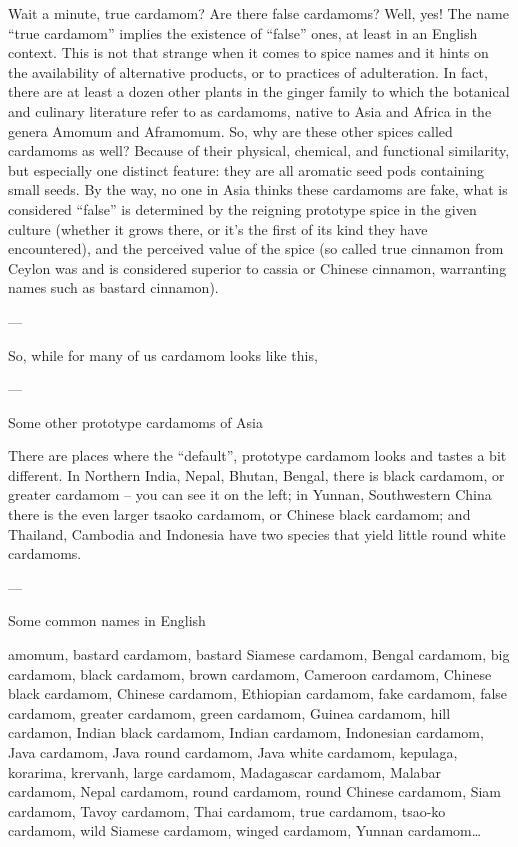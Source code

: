\documentclass[12pt]{article}
\begin{document}
Wait a minute, true cardamom? Are there false cardamoms? Well, yes! The name “true cardamom” implies the existence of “false” ones, at least in an English context.
This is not that strange when it comes to spice names and it hints on the availability of alternative products, or to practices of adulteration. 
In fact, there are at least a dozen other plants in the ginger family to which the botanical and culinary literature refer to as cardamoms, 
native to Asia and Africa in the genera Amomum and Aframomum.
So, why are these other spices called cardamoms as well? Because of their physical, chemical, and functional similarity, but especially one distinct feature: they are all aromatic seed pods containing small seeds. 
By the way, no one in Asia thinks these cardamoms are fake, what is considered “false” is determined by the reigning prototype spice in the given culture (whether it grows there, or it’s the first of its kind they have encountered), and the perceived value of the spice (so called true cinnamon from Ceylon was and is considered superior to cassia or Chinese cinnamon, warranting names such as bastard cinnamon).

---

So, while for many of us cardamom looks like this,

---

Some other prototype cardamoms of Asia

There are places where the “default”, prototype cardamom looks and tastes a bit different.
In Northern India, Nepal, Bhutan, Bengal, there is black cardamom, or greater cardamom – you can see it on the left; in Yunnan, Southwestern China there is the even larger tsaoko cardamom, or Chinese black cardamom; and Thailand, Cambodia and Indonesia have two species that yield little round white cardamoms. 

---

Some common names in English

amomum, bastard cardamom, bastard Siamese cardamom, Bengal cardamom, big cardamom, black cardamom, brown cardamom, Cameroon cardamom, Chinese black cardamom, Chinese cardamom, Ethiopian cardamom, fake cardamom, false cardamom, greater cardamom, green cardamom, Guinea cardamom, hill cardamon, Indian black cardamom, Indian cardamom, Indonesian cardamom, Java cardamom, Java round cardamom, Java white cardamom, kepulaga, korarima, krervanh, large cardamom, Madagascar cardamom, Malabar cardamom, Nepal cardamom, round cardamom, round Chinese cardamom, Siam cardamom, Tavoy cardamom, Thai cardamom, true cardamom, tsao-ko cardamom, wild Siamese cardamom, winged cardamom, Yunnan cardamom…
\end{document}
